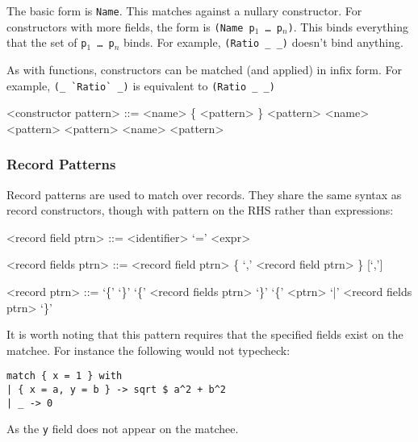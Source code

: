 The basic form is \texttt{Name}. This matches against a nullary constructor. For constructors with more fields, the form is \texttt{(Name p$_1$ … p$_n$)}. This binds everything that the set of \texttt{p$_1$ … p$_n$} binds. For example, \texttt{(Ratio\ _\ _)} doesn’t bind anything.

As with functions, constructors can be matched (and applied) in infix form. For example, \texttt{(_\ \`{}Ratio\`{}\ _)} is equivalent to \texttt{(Ratio\ _\ _)}

\begin{grammar}
<constructor pattern> ::= <name> \{ <pattern> \}
                     \alt <pattern> <name> <pattern>
                     \alt <pattern> \lit{\`{}} <name> \lit{\`{}} <pattern>
\end{grammar}

\subsubsection{Record Patterns}
Record patterns are used to match over records. They share the same syntax as record constructors, though with pattern on the RHS rather than expressions:

\begin{grammar}
<record field ptrn>  ::= <identifier> `=' <expr>

<record fields ptrn> ::= <record field ptrn> \{ `,' <record field ptrn> \} [`,']

<record ptrn> ::= `\{' `\}'
        \alt `\{' <record fields ptrn> `\}'
        \alt `\{' <ptrn> `|' <record fields ptrn> `\}'
\end{grammar}

It is worth noting that this pattern requires that the specified fields exist on the matchee. For instance the following would not typecheck:

\begin{verbatim}
match { x = 1 } with
| { x = a, y = b } -> sqrt $ a^2 + b^2
| _ -> 0
\end{verbatim}

As the \texttt{y} field does not appear on the matchee.